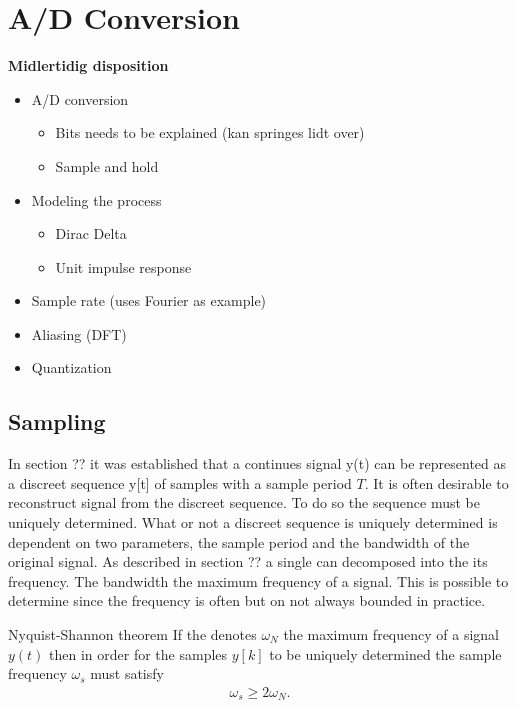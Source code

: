 \chapter{A/D Conversion}





\textbf{Midlertidig disposition}
\begin{itemize}
    \item A/D conversion
    \begin{itemize}
        \item Bits needs to be explained (kan springes lidt over)
        \item Sample and hold
    \end{itemize}
    \item Modeling the process
    \begin{itemize}
        \item Dirac Delta
        \item Unit impulse response
    \end{itemize}
    \item Sample rate (uses Fourier as example)
    \item Aliasing (DFT)
    \item Quantization
\end{itemize}

\section{Sampling}
In section ?? it was established that a continues signal y(t) can be represented as a discreet sequence y[t] of samples with a sample period $T$. 
 It is often desirable to reconstruct signal from the discreet sequence. To do so the sequence must be uniquely determined. What or not a discreet sequence is uniquely determined is dependent on two parameters, the sample period and the bandwidth of the original signal. As described in section ?? a single can decomposed into the its frequency. The bandwidth the maximum frequency of a signal. This is possible to determine since the frequency is often but on not always bounded in practice.   

\begin{theorem}{Nyquist-Shannon theorem}
    If the denotes $\omega_N$ the maximum frequency  of a signal $y(t)$ then in order for the samples $y[k]$ to be uniquely determined the sample frequency $\omega_s$ must satisfy
    \begin{align*}
        \omega_s \geq 2\omega_N.
    \end{align*}
\end{theorem}
